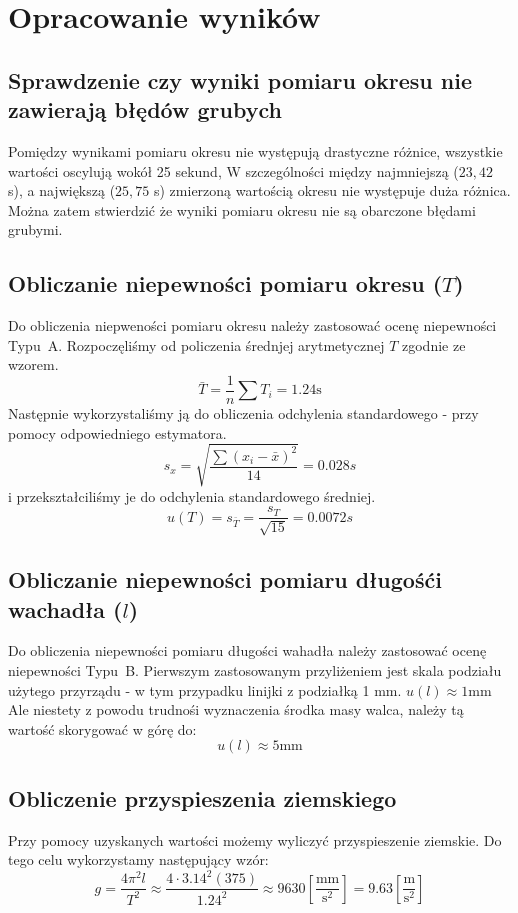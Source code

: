 \documentclass{fizraport}
\begin{document}
\pagebreak
\section{Opracowanie wyników}
\subsection{Sprawdzenie czy wyniki pomiaru okresu nie zawierają błędów grubych}
Pomiędzy wynikami pomiaru okresu nie występują drastyczne różnice, wszystkie wartości oscylują wokół 25 sekund, W szczególności między najmniejszą ($23,42$ s), a największą ($25,75$ s) zmierzoną wartością okresu nie występuje duża różnica. Można zatem stwierdzić że wyniki pomiaru okresu nie są obarczone błędami grubymi.

\subsection{Obliczanie niepewności pomiaru okresu ($T$)}
Do obliczenia niepweności pomiaru okresu należy zastosować ocenę niepewności Typu~A.
Rozpoczęliśmy od policzenia średnjej arytmetycznej $T$ zgodnie ze wzorem.
\[ \bar{T} = \frac{1}{n}\sum{T_i} = 1.24\text{s}\]
Następnie wykorzystaliśmy ją do obliczenia odchylenia standardowego - przy pomocy odpowiedniego estymatora.
\[s_x=\sqrt{\frac{\sum{(x_i-\bar{x})^2}}{14}}=0.028s\]
i przekształciliśmy je do odchylenia standardowego średniej.
\[u(T)=s_{\bar{T}}=\frac{s_T}{\sqrt{15}}=0.0072s\]
\subsection{Obliczanie niepewności pomiaru długośći wachadła ($l$)}
Do obliczenia niepewności pomiaru długości wahadła należy zastosować ocenę niepewności Typu~B.
Pierwszym zastosowanym przyliżeniem jest skala podziału użytego przyrządu - w tym przypadku linijki z podziałką 1 mm. $u(l) \approx 1\text{mm}$ Ale niestety z powodu trudnośi wyznaczenia środka masy walca, należy tą wartość skorygować w górę do:
\[ u(l) \approx 5\text{mm}\]
\pagebreak
\subsection{Obliczenie przyspieszenia ziemskiego}
Przy pomocy uzyskanych wartości możemy wyliczyć przyspieszenie ziemskie.
Do tego celu wykorzystamy następujący wzór:
\[ g = \frac{4\pi^2l}{T^2} \approx \frac{{4 \cdot {3.14}^2 (375)}}{{1.24}^2} \approx 9630 \left[\frac{\text{mm}}{\text{s}^2}\right] = 9.63 \left[\frac{\text{m}}{\text{s}^2}\right]\]
\end{document}
